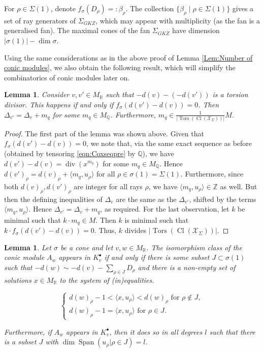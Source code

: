 \documentclass[reqno, 12pt]{amsart}
\newtheorem{lemma}[theorem]{Lemma}
\theoremstyle{definition}
\numberwithin{equation}{section}
\newcommand{\Z}{\mathbb{Z}}
\newcommand{\R}{\mathbb{R}}
\newcommand{\Q}{\mathbb{Q}}
\begin{document}
For $\rho\in \Sigma(1)$, denote $f_{\sigma}(D_\rho)=:\beta_\rho$. The collection $\{\beta_\rho\mid \rho\in \Sigma(1)\}$ gives a set of ray generators of $\Sigma_{GKZ}$, which may appear with multiplicity (as the fan is a generalised fan). The maximal cones of the fan $\Sigma_{GKZ}$ have dimension $|\sigma(1)|-\dim \sigma$.

Using the same considerations as in the above proof of Lemma \ref{Lem:Number of conic modules}, we also obtain the following result, which will simplify the combinatorics of conic modules later on. 
\begin{lemma}
    \label{Lem:TorsionInvarianceMQ}
    Consider $v, v'\in M_\R$ such that $-d(v)-(-d(v'))$ is a torsion divisor. This happens if and only if $f_{\sigma}(d(v')-d(v))=0$. Then $\Delta_{v'}=\Delta_{v}+m_q$ for some $m_q\in M_\Q$. Furthermore, $m_q\in \frac{1}{|\operatorname{Tors}(\operatorname{Cl}(\mathcal{X}_\Sigma))|}M$.
\end{lemma}
\begin{proof}
    The first part of the lemma was shown above. Given that $f_{\sigma}(d(v')-d(v))=0$, we note that, via the same exact sequence as before (obtained by tensoring \eqref{eqn:Coxseqpre} by $\Q$), we have $d(v')-d(v)=\operatorname{div}(x^{m_q})$ for some $m_q\in M_\Q$. Hence $d(v')_\rho=d(v)_\rho+\langle m_q,u_\rho\rangle$ for all $\rho\in \sigma(1)=\Sigma(1)$. Furthermore, since both $d(v)_\rho, d(v')_\rho$ are integer for all rays $\rho$, we have $\langle m_q,u_\rho\rangle\in \Z$ as well. But then the defining inequalities of $\Delta_v$ are the same as the $\Delta_{v'}$, shifted by the terms $\langle m_q,u_\rho\rangle$. Hence $\Delta_{v'}=\Delta_{v}+m_q$, as required.
    For the last observation, let $k$ be minimal such that $k\cdot m_q\in M$. Then $k$ is minimal such that $k\cdot f_{\sigma}(d(v')-d(v))=0$. Thus, $k$ divides $\vert \operatorname{Tors}(\operatorname{Cl}(\mathcal{X}_\Sigma))|$. 
\end{proof}



\begin{lemma}
    \label{Lem:FacetCondition}
    Let $\sigma$ be a cone and let $v,w\in M_\R$.
    The isomorphism class of the conic module $A_w$ appears in $K_v^\bullet$ if and only if there is some subset $J\subset \sigma(1)$ such that $-d(w)\sim -d(v)-\sum_{\rho\in J}D_\rho$ and there is a non-empty set  of solutions $x\in M_\R$ to the system of (in)equalities.

        \begin{equation}
            \label{eq:FacetCondition}
            \begin{cases} d(w)_\rho-1 <\langle x,u_\rho\rangle <d(w)_\rho \text{ for }\rho \not\in J,\\
             d(w)_\rho-1 =\langle x,u_\rho\rangle\text{ for } \rho \in J.\end{cases}
        \end{equation}

    Furthermore, if $A_w$ appears in $K_v^\bullet$, then it does so in all degrees $l$ such that there is a subset $J$ with $\dim\operatorname{Span}(u_\rho\vert\rho\in J)=l$.
\end{lemma}
\end{document}

